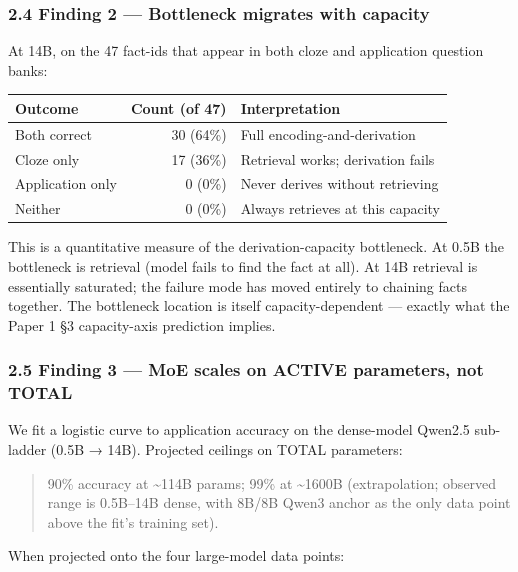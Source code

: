 \documentclass[
]{article}
\newcounter{none} %
\begin{document}
\subsubsection{2.4 Finding 2 --- Bottleneck migrates with
capacity}\label{finding-2-bottleneck-migrates-with-capacity}

At 14B, on the 47 fact-ids that appear in both cloze and application
question banks:

{\def\LTcaptype{none} %
\begin{longtable}[]{@{}lrl@{}}
\toprule\noalign{}
Outcome & Count (of 47) & Interpretation \\
\midrule\noalign{}
\endhead
\bottomrule\noalign{}
\endlastfoot
Both correct & 30 (64\%) & Full encoding-and-derivation \\
Cloze only & 17 (36\%) & Retrieval works; derivation fails \\
Application only & 0 (0\%) & Never derives without retrieving \\
Neither & 0 (0\%) & Always retrieves at this capacity \\
\end{longtable}
}

This is a quantitative measure of the derivation-capacity bottleneck. At
0.5B the bottleneck is retrieval (model fails to find the fact at all).
At 14B retrieval is essentially saturated; the failure mode has moved
entirely to chaining facts together. The bottleneck location is itself
capacity-dependent --- exactly what the Paper 1 §3 capacity-axis
prediction implies.

\subsubsection{2.5 Finding 3 --- MoE scales on ACTIVE parameters, not
TOTAL}\label{finding-3-moe-scales-on-active-parameters-not-total}

We fit a logistic curve to application accuracy on the dense-model
Qwen2.5 sub-ladder (0.5B → 14B). Projected ceilings on TOTAL parameters:

\begin{quote}
90\% accuracy at \textasciitilde114B params; 99\% at
\textasciitilde1600B (extrapolation; observed range is 0.5B--14B dense,
with 8B/8B Qwen3 anchor as the only data point above the fit's training
set).
\end{quote}

When projected onto the four large-model data points:
\end{document}
